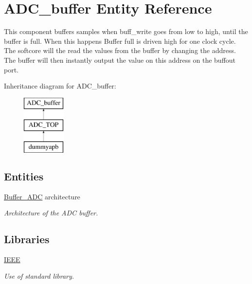 \hypertarget{classADC__buffer}{\section{A\-D\-C\-\_\-buffer Entity Reference}
\label{classADC__buffer}
}


This component buffers samples when buff\-\_\-write goes from low to high, until the buffer is full. When this happens Buffer full is driven high for one clock cycle. The softcore will the read the values from the buffer by changing the address. The buffer will then instantly output the value on this address on the buffout port.  


Inheritance diagram for A\-D\-C\-\_\-buffer\-:\begin{figure}[H]
\begin{center}
\leavevmode
\includegraphics[height=3.000000cm]{classADC__buffer}
\end{center}
\end{figure}
\subsection*{Entities}
\begin{DoxyCompactItemize}
\item 
\hyperlink{classADC__buffer_1_1Buffer__ADC}{Buffer\-\_\-\-A\-D\-C} architecture
\begin{DoxyCompactList}\small\item\em Architecture of the A\-D\-C buffer. \end{DoxyCompactList}\end{DoxyCompactItemize}
\subsection*{Libraries}
 \begin{DoxyCompactItemize}
\item 
\hypertarget{classADC__buffer_ae4f03c286607f3181e16b9aa12d0c6d4}{\hyperlink{classADC__buffer_ae4f03c286607f3181e16b9aa12d0c6d4}{I\-E\-E\-E} }\label{classADC__buffer_ae4f03c286607f3181e16b9aa12d0c6d4}

\begin{DoxyCompactList}\small\item\em Use of standard library. \end{DoxyCompactList}\end{DoxyCompactItemize}
